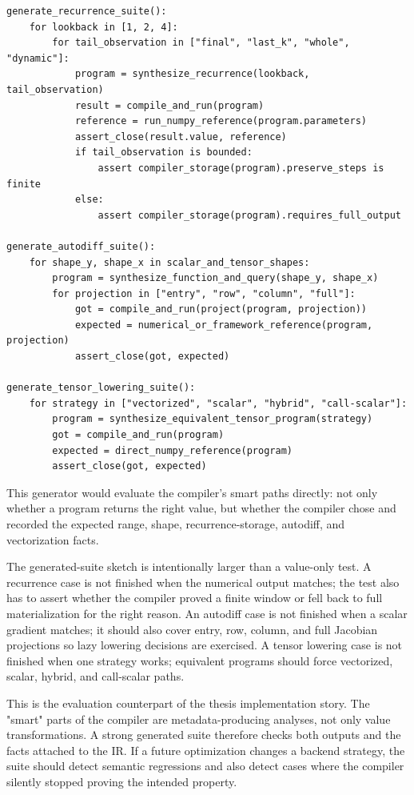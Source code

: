 \begin{lstlisting}[style=pythoncode,caption={Generated evaluation-suite outline.}]
generate_recurrence_suite():
    for lookback in [1, 2, 4]:
        for tail_observation in ["final", "last_k", "whole", "dynamic"]:
            program = synthesize_recurrence(lookback, tail_observation)
            result = compile_and_run(program)
            reference = run_numpy_reference(program.parameters)
            assert_close(result.value, reference)
            if tail_observation is bounded:
                assert compiler_storage(program).preserve_steps is finite
            else:
                assert compiler_storage(program).requires_full_output

generate_autodiff_suite():
    for shape_y, shape_x in scalar_and_tensor_shapes:
        program = synthesize_function_and_query(shape_y, shape_x)
        for projection in ["entry", "row", "column", "full"]:
            got = compile_and_run(project(program, projection))
            expected = numerical_or_framework_reference(program, projection)
            assert_close(got, expected)

generate_tensor_lowering_suite():
    for strategy in ["vectorized", "scalar", "hybrid", "call-scalar"]:
        program = synthesize_equivalent_tensor_program(strategy)
        got = compile_and_run(program)
        expected = direct_numpy_reference(program)
        assert_close(got, expected)
\end{lstlisting}

This generator would evaluate the compiler's smart paths directly: not only
whether a program returns the right value, but whether the compiler chose and
recorded the expected range, shape, recurrence-storage, autodiff, and
vectorization facts.

The generated-suite sketch is intentionally larger than a value-only test. A
recurrence case is not finished when the numerical output matches; the test
also has to assert whether the compiler proved a finite window or fell back to
full materialization for the right reason. An autodiff case is not finished
when a scalar gradient matches; it should also cover entry, row, column, and
full Jacobian projections so lazy lowering decisions are exercised. A tensor
lowering case is not finished when one strategy works; equivalent programs
should force vectorized, scalar, hybrid, and call-scalar paths.

This is the evaluation counterpart of the thesis implementation story. The
"smart" parts of the compiler are metadata-producing analyses, not only value
transformations. A strong generated suite therefore checks both outputs and the
facts attached to the IR. If a future optimization changes a backend strategy,
the suite should detect semantic regressions and also detect cases where the
compiler silently stopped proving the intended property.

